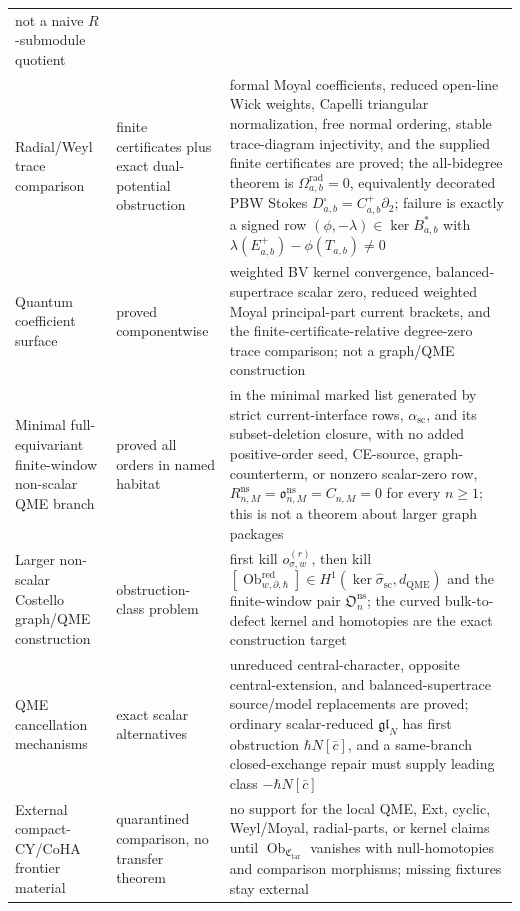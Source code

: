 \begin{longtable}{@{}>{\raggedright\arraybackslash}p{}
  >{\raggedright\arraybackslash}p{}
  >{\raggedright\arraybackslash}p{}@{}}
not a naive \(R\)-submodule quotient\\
Radial/Weyl trace comparison & finite certificates plus exact
dual-potential obstruction &
formal Moyal coefficients, reduced open-line Wick weights, Capelli
triangular normalization, free normal ordering, stable trace-diagram
injectivity, and the supplied finite certificates are proved; the
all-bidegree theorem is
\(\Omega^{\mathrm{rad}}_{a,b}=0\), equivalently decorated PBW Stokes
\(D^\square_{a,b}=C^+_{a,b}\partial_2\); failure is exactly a signed row
\((\phi,-\lambda)\in\ker B_{a,b}^*\) with
\(\lambda(E^+_{a,b})-\phi(T_{a,b})\ne0\)\\
Quantum coefficient surface & proved componentwise &
weighted BV kernel convergence, balanced-supertrace scalar zero,
reduced weighted Moyal principal-part current brackets, and the
finite-certificate-relative degree-zero trace comparison; not a graph/QME
construction\\
Minimal full-equivariant finite-window non-scalar QME branch & proved all
orders in named habitat &
in the minimal marked list generated by strict current-interface rows,
\(\alpha_{\mathrm{sc}}\), and its subset-deletion closure, with no added
positive-order seed, CE-source, graph-counterterm, or nonzero scalar-zero
row, \(R^{\mathrm{ns}}_{n,M}=\mathfrak o^{\mathrm{ns}}_{n,M}=C_{n,M}=0\)
for every \(n\geq1\); this is not a theorem about larger graph packages\\
Larger non-scalar Costello graph/QME construction & obstruction-class
problem &
first kill \(o_{\sigma,w}^{(r)}\), then kill
\([\operatorname{Ob}^{\mathrm{red}}_{w,\partial,\hbar}]\in
H^1(\ker\widehat\sigma_{\mathrm{sc}},d_{\mathrm{QME}})\) and the
finite-window pair \(\mathfrak O_n^{\mathrm{ns}}\); the curved
bulk-to-defect kernel and homotopies are the exact construction target\\
QME cancellation mechanisms & exact scalar alternatives &
unreduced central-character, opposite central-extension, and
balanced-supertrace source/model replacements are proved; ordinary
scalar-reduced \(\mathfrak{gl}_N\) has first obstruction
\(\hbar N[\bar c]\), and a same-branch closed-exchange repair must supply
leading class \(-\hbar N[\bar c]\)\\
External compact-CY/CoHA frontier material & quarantined comparison, no
transfer theorem &
no support for the local QME, Ext, cyclic, Weyl/Moyal, radial-parts, or
kernel claims until
\(\operatorname{Ob}_{\mathfrak C_{\mathrm{tar}}}\) vanishes with
null-homotopies and comparison morphisms; missing fixtures stay external
\end{longtable}

